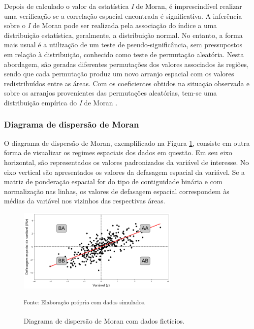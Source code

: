 \documentclass[12pt,a4paper]{article}
\begin{document}
Depois de calculado o valor da estatística \textit{I} de Moran, é imprescindível realizar uma verificação se a correlação espacial encontrada é significativa. A inferência sobre o \textit{I} de Moran pode ser realizada pela associação do índice a uma distribuição estatística, geralmente, a distribuição normal. No entanto, a forma mais usual é a utilização de um teste de pseudo-significância, sem pressupostos em relação à distribuição, conhecido como teste de permutação aleatória. Nesta abordagem, são geradas diferentes permutações dos valores associados às regiões, sendo que cada permutação produz um novo arranjo espacial com os valores redistribuídos entre as áreas. Com os coeficientes obtidos na situação observada e sobre os arranjos provenientes das permutações aleatórias, tem-se uma distribuição empírica do \textit{I} de Moran \cite{camara04_2}.

\subsubsection{Diagrama de dispersão de Moran}
	
O diagrama de dispersão de Moran, exemplificado na Figura \ref{dispersaomoran_2}, consiste em outra forma de visualizar os regimes espaciais dos dados em questão. Em seu eixo horizontal, são representados os valores padronizados da variável de interesse. No eixo vertical são apresentados os valores da defasagem espacial da variável. Se a matriz de ponderação espacial for do tipo de contiguidade binária e com normalização nas linhas, os valores de defasagem espacial correspondem às médias da variável nos vizinhos das respectivas áreas.

\begin{figure}[H]
	\centering
	\caption{Diagrama de dispersão de Moran com dados fictícios.}\label{dispersaomoran_2}
	\includegraphics[width=0.7\textwidth]{figuras/moran_scatter.png}\\
	\parbox{\dimexpr\linewidth-5cm}{\raggedright
    \strut \textsuperscript{Fonte: Elaboração própria com dados simulados.}\strut}
\end{figure}
\end{document}

